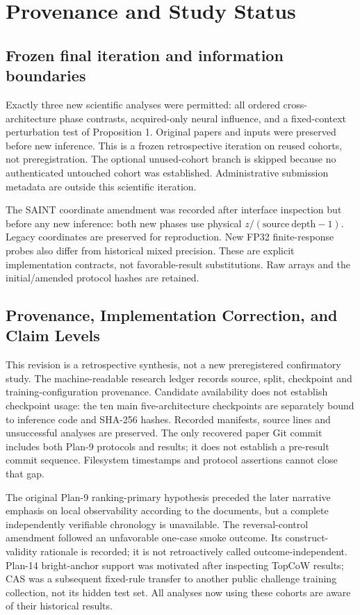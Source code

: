 \section{Provenance and Study Status}
\subsection{Frozen final iteration and information boundaries}
Exactly three new scientific analyses were permitted: all ordered cross-architecture phase contrasts, acquired-only neural influence, and a fixed-context perturbation test of Proposition 1. Original papers and inputs were preserved before new inference. This is a frozen retrospective iteration on reused cohorts, not preregistration. The optional unused-cohort branch is skipped because no authenticated untouched cohort was established. Administrative submission metadata are outside this scientific iteration.

The SAINT coordinate amendment was recorded after interface inspection but before any new inference: both new phases use physical $z/(\mathrm{source\ depth}-1)$. Legacy coordinates are preserved for reproduction. New FP32 finite-response probes also differ from historical mixed precision. These are explicit implementation contracts, not favorable-result substitutions. Raw arrays and the initial/amended protocol hashes are retained.

\subsection{Provenance, Implementation Correction, and Claim Levels}
This revision is a retrospective synthesis, not a new preregistered confirmatory study. The machine-readable research ledger records source, split, checkpoint and training-configuration provenance. Candidate availability does not establish checkpoint usage: the ten main five-architecture checkpoints are separately bound to inference code and SHA-256 hashes. Recorded manifests, source lines and unsuccessful analyses are preserved. The only recovered paper Git commit includes both Plan-9 protocols and results; it does not establish a pre-result commit sequence. Filesystem timestamps and protocol assertions cannot close that gap.

The original Plan-9 ranking-primary hypothesis preceded the later narrative emphasis on local observability according to the documents, but a complete independently verifiable chronology is unavailable. The reversal-control amendment followed an unfavorable one-case smoke outcome. Its construct-validity rationale is recorded; it is not retroactively called outcome-independent. Plan-14 bright-anchor support was motivated after inspecting TopCoW results; CAS was a subsequent fixed-rule transfer to another public challenge training collection, not its hidden test set. All analyses now using these cohorts are aware of their historical results.

